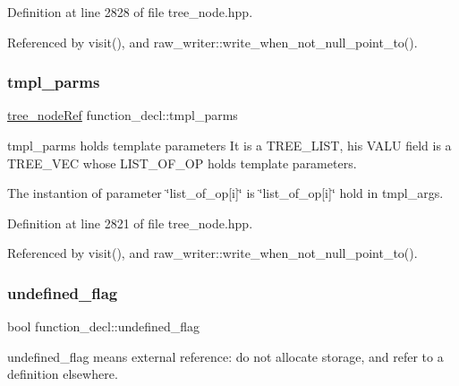 Definition at line 2828 of file tree\+\_\+node.\+hpp.



Referenced by visit(), and raw\+\_\+writer\+::write\+\_\+when\+\_\+not\+\_\+null\+\_\+point\+\_\+to().

\mbox{\label{structfunction__decl_a467966c33443732c7b158139ac7d0ec6}} 
\subsubsection{\texorpdfstring{tmpl\+\_\+parms}{tmpl\_parms}}
{\footnotesize\ttfamily \hyperlink{tree__node_8hpp_a6ee377554d1c4871ad66a337eaa67fd5}{tree\+\_\+node\+Ref} function\+\_\+decl\+::tmpl\+\_\+parms}



tmpl\+\_\+parms holds template parameters It is a T\+R\+E\+E\+\_\+\+L\+I\+ST, his V\+A\+LU field is a T\+R\+E\+E\+\_\+\+V\+EC whose L\+I\+S\+T\+\_\+\+O\+F\+\_\+\+OP holds template parameters. 

The instantion of parameter \char`\"{}list\+\_\+of\+\_\+op\mbox{[}i\mbox{]}\char`\"{} is \char`\"{}list\+\_\+of\+\_\+op\mbox{[}i\mbox{]}\char`\"{} hold in tmpl\+\_\+args. 

Definition at line 2821 of file tree\+\_\+node.\+hpp.



Referenced by visit(), and raw\+\_\+writer\+::write\+\_\+when\+\_\+not\+\_\+null\+\_\+point\+\_\+to().

\mbox{\label{structfunction__decl_a049eeab7e558df69c1398cb31e96168c}} 
\subsubsection{\texorpdfstring{undefined\+\_\+flag}{undefined\_flag}}
{\footnotesize\ttfamily bool function\+\_\+decl\+::undefined\+\_\+flag}



undefined\+\_\+flag means external reference\+: do not allocate storage, and refer to a definition elsewhere. 

